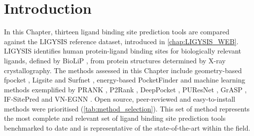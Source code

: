 \section{Introduction}


In this Chapter, thirteen ligand binding site prediction tools are compared against the LIGYSIS reference dataset, introduced in \autoref{chap:LIGYSIS_WEB}. LIGYSIS identifies human protein-ligand binding sites for biologically relevant ligands, defined by BioLiP \cite{YANG_2013_BIOLIP}, from protein structures determined by X-ray crystallography. The methods assessed in this Chapter include geometry-based fpocket \cite{GUILLOUX_2009_FPOCKET}, Ligsite \cite{HENDLICH_1997_LIGSITE} and Surfnet \cite{LASKOWSKI_1995_SURFNET}, energy-based PocketFinder \cite{AN_2005_POCKETFINDER} and machine learning methods exemplified by PRANK \cite{KRIVAK_2015_PRANK}, P2Rank \cite{KRIVAK_2015_P2RANK, KRIVAK_2018_P2RANK}, DeepPocket \cite{AGGARWAL_2022_DEEPPOCKET}, PUResNet \cite{KANDEL_2021_PURESNET, KANDEL_2024_PURESNET}, GrASP \cite{SMITH_2024_GrASP}, IF-SitePred \cite{CARBERY_2024_IFSP} and VN-EGNN \cite{SESTAK_2024_VNEGNN}. Open source, peer-reviewed and easy-to-install methods were prioritised (\autoref{tab:method_selection}). This set of method represents the most complete and relevant set of ligand binding site prediction tools benchmarked to date and is representative of the state-of-the-art within the field.


